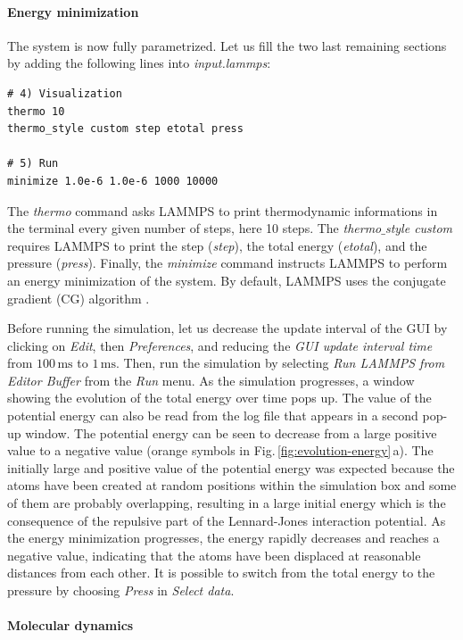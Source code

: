 \documentclass[9pt,tutorial]{livecoms}
\begin{document}
\paragraph{Energy minimization}
The system is now fully parametrized. Let us fill the two last remaining sections by adding the following lines into \textit{input.lammps}:
{\normalsize \begin{verbatim}
# 4) Visualization
thermo 10
thermo_style custom step etotal press

# 5) Run
minimize 1.0e-6 1.0e-6 1000 10000
\end{verbatim}}
The \textit{thermo} command asks LAMMPS to print thermodynamic informations in the terminal every given number of steps, here 10 steps. The \textit{thermo$\_$style custom} requires LAMMPS to print the step (\textit{step}), the total energy (\textit{etotal}), and the pressure (\textit{press}). Finally, the \textit{minimize} command instructs LAMMPS to perform an energy minimization of the system. By default, LAMMPS uses the conjugate gradient (CG) algorithm \cite{hestenes1952methods}.

Before running the simulation, let us decrease the update interval of the GUI by clicking on \textit{Edit}, then \textit{Preferences}, and reducing the \textit{GUI update interval time} from $100\,\text{ms}$ to $1\,\text{ms}$. Then, run the simulation by selecting \textit{Run LAMMPS from Editor Buffer} from the \textit{Run} menu. As the simulation progresses, a window showing the evolution of the total energy over time pops up. The value of the potential energy can also be read from the log file that appears in a second pop-up window. The potential energy can be seen to decrease from a large positive value to a negative value (orange symbols in Fig.\,\ref{fig:evolution-energy}\,a). The initially large and positive value of the potential energy was expected because the atoms have been created at random positions within the simulation box and some of them are probably overlapping, resulting in a large initial energy which is the consequence of the repulsive part of the Lennard-Jones interaction potential. As the energy minimization progresses, the energy rapidly decreases and reaches a negative value, indicating that the atoms have been displaced at reasonable distances from each other. It is possible to switch from the total energy to the pressure by choosing \textit{Press} in \textit{Select data}.

\paragraph{Molecular dynamics}
\end{document}
